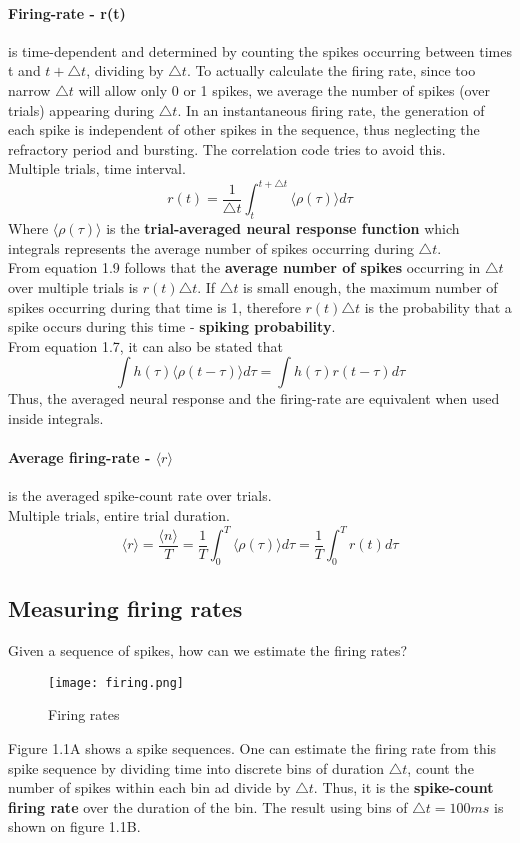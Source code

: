\documentclass{report}
\begin{document}
\paragraph{Firing-rate - r(t)} is time-dependent and determined by counting the spikes occurring between times t and $t +\triangle t$, dividing by $\triangle t$. To actually calculate the firing rate, since too narrow $\triangle t$ will allow only 0 or 1 spikes, we average the number of spikes (over trials) appearing during $\triangle t$. In an instantaneous firing rate, the generation of each spike is independent of other spikes in the sequence, thus neglecting the refractory period and bursting. The correlation code tries to avoid this. 
\\Multiple trials, time interval.
\begin{equation}
r(t) = \frac{1}{\triangle t}\int_{t}^{t+\triangle t}\langle\rho(\tau)\rangle d\tau
\end{equation}
Where $\langle\rho(\tau)\rangle$ is the \textbf{trial-averaged neural response function} which integrals represents the average number of spikes occurring during $\triangle t$.
\\From equation 1.9 follows that the \textbf{average number of spikes} occurring in $\triangle t$ over multiple trials is $r(t)\triangle t$. If $\triangle t$ is small enough, the maximum number of spikes occurring during that time is 1, therefore $r(t)\triangle t$ is the probability that a spike occurs during this time -\textbf{ spiking probability}. 
\\From equation 1.7, it can also be stated that 
\begin{equation}
\int h(\tau)\langle\rho(t-\tau)\rangle d\tau= \int h(\tau)r(t-\tau) d\tau
\end{equation}
Thus, the averaged neural response and the firing-rate are equivalent when used inside integrals.
\paragraph{Average firing-rate - \textbf{$\langle r \rangle$}} is the averaged spike-count rate over trials.
\\Multiple trials, entire trial duration.
\begin{equation}
\langle r \rangle = \frac{\langle n \rangle}{T}=\frac{1}{T} \int_{0}^{T}\langle \rho(\tau) \rangle d\tau = \frac{1}{T} \int_{0}^{T} r(t) d\tau
\end{equation}
\subsection{Measuring firing rates}
Given a sequence of spikes, how can we estimate the firing rates?
\begin{figure}[H]
\centering
  \texttt{[image: firing.png]}
\caption{Firing rates}
\end{figure}
Figure 1.1A shows a spike sequences. One can estimate the firing rate from this spike sequence by dividing time into discrete bins of duration $\triangle t$, count the number of spikes within each bin ad divide by $\triangle t$. Thus, it is the \textbf{spike-count firing rate} over the duration of the bin. The result using bins of $\triangle t = 100ms$ is shown on figure 1.1B.
\end{document}
